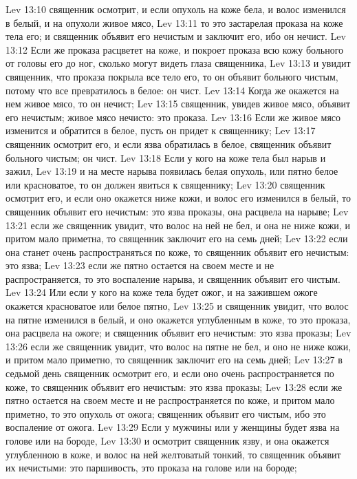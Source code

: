 \vs Lev 13:10 священник осмотрит, и если опухоль на коже бела, и волос изменился в белый, и на опухоли живое мясо,
\vs Lev 13:11 то это застарелая проказа на коже тела его; и священник объявит его нечистым и заключит его, ибо он нечист.
\vs Lev 13:12 Если же проказа расцветет на коже, и покроет проказа всю кожу больного от головы его до ног, сколько могут видеть глаза священника,
\vs Lev 13:13 и увидит священник, что проказа покрыла все тело его, то он объявит больного чистым, потому что все превратилось в белое: он чист.
\vs Lev 13:14 Когда же окажется на нем живое мясо, то он нечист;
\vs Lev 13:15 священник, увидев живое мясо, объявит его нечистым; живое мясо нечисто: это проказа.
\vs Lev 13:16 Если же живое мясо изменится и обратится в белое, пусть он придет к священнику;
\vs Lev 13:17 священник осмотрит его, и если язва обратилась в белое, священник объявит больного чистым; он чист.
\rsbpar\vs Lev 13:18 Если у кого на коже тела был нарыв и зажил,
\vs Lev 13:19 и на месте нарыва появилась белая опухоль, или пятно белое или красноватое, то он должен явиться к священнику;
\vs Lev 13:20 священник осмотрит его, и если оно окажется ниже кожи, и волос его изменился в белый, то священник объявит его нечистым: это язва проказы, она расцвела на нарыве;
\vs Lev 13:21 если же священник увидит, что волос на ней не бел, и она не ниже кожи, и притом мало приметна, то священник заключит его на семь дней;
\vs Lev 13:22 если она станет очень распространяться по коже, то священник объявит его нечистым: это язва;
\vs Lev 13:23 если же пятно остается на своем месте и не распространяется, то это воспаление нарыва, и священник объявит его чистым.
\vs Lev 13:24 Или если у кого на коже тела будет ожог, и на зажившем ожоге окажется красноватое или белое пятно,
\vs Lev 13:25 и священник увидит, что волос на пятне изменился в белый, и оно окажется углубленным в коже, то это проказа, она расцвела на ожоге; и священник объявит его нечистым: это язва проказы;
\vs Lev 13:26 если же священник увидит, что волос на пятне не бел, и оно не ниже кожи, и притом мало приметно, то священник заключит его на семь дней;
\vs Lev 13:27 в седьмой день священник осмотрит его, и если оно очень распространяется по коже, то священник объявит его нечистым: это язва проказы;
\vs Lev 13:28 если же пятно остается на своем месте и не распространяется по коже, и притом мало приметно, то это опухоль от ожога; священник объявит его чистым, ибо это воспаление от ожога.
\rsbpar\vs Lev 13:29 Если у мужчины или у женщины будет язва на голове или на бороде,
\vs Lev 13:30 и осмотрит священник язву, и она окажется углубленною в коже, и волос на ней желтоватый тонкий, то священник объявит их нечистыми: это паршивость, это проказа на голове или на бороде;

